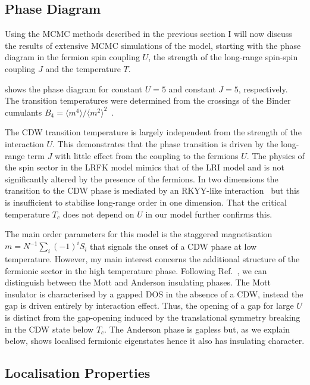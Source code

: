\hypertarget{lrfk-results-phase-diagram}{%
\subsection{Phase Diagram}\label{lrfk-results-phase-diagram}}

Using the MCMC methods described in the previous section I will now discuss the results of extensive MCMC simulations of the model, starting with the phase diagram in the fermion spin coupling \(U\), the strength of the long-range spin-spin coupling \(J\) and the temperature \(T\).

 shows the phase diagram for constant \(U=5\) and constant \(J=5\), respectively. The transition temperatures were determined from the crossings of the Binder cumulants \(B_4 = \langle m^4 \rangle /\langle m^2 \rangle^2\)~\autocite{binderFiniteSizeScaling1981}.

The CDW transition temperature is largely independent from the strength of the interaction \(U\). This demonstrates that the phase transition is driven by the long-range term \(J\) with little effect from the coupling to the fermions \(U\). The physics of the spin sector in the LRFK model mimics that of the LRI model and is not significantly altered by the presence of the fermions. In two dimensions the transition to the CDW phase is mediated by an RKYY-like interaction~\autocite{rusinCalculationRKKYRange2017} but this is insufficient to stabilise long-range order in one dimension. That the critical temperature \(T_c\) does not depend on \(U\) in our model further confirms this.

The main order parameters for this model is the staggered magnetisation \(m = N^{-1} \sum_i (-1)^i S_i\) that signals the onset of a CDW phase at low temperature. However, my main interest concerns the additional structure of the fermionic sector in the high temperature phase. Following Ref.~\autocite{antipovInteractionTunedAndersonMott2016}, we can distinguish between the Mott and Anderson insulating phases. The Mott insulator is characterised by a gapped DOS in the absence of a CDW, instead the gap is driven entirely by interaction effect. Thus, the opening of a gap for large \(U\) is distinct from the gap-opening induced by the translational symmetry breaking in the CDW state below \(T_c\). The Anderson phase is gapless but, as we explain below, shows localised fermionic eigenstates hence it also has insulating character.

\hypertarget{localisation-properties}{%
\subsection{Localisation Properties}\label{localisation-properties}}

